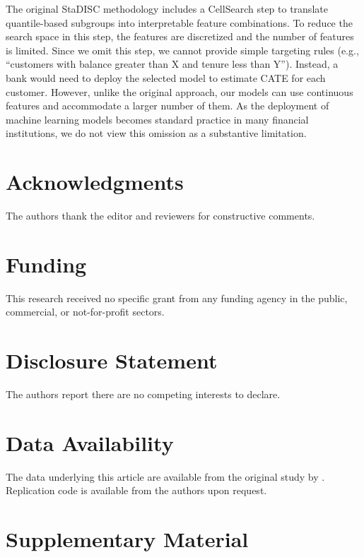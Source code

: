 \documentclass[12pt]{article}
\begin{document}
The original StaDISC methodology includes a CellSearch step to translate quantile-based subgroups into interpretable feature combinations. To reduce the search space in this step, the features are discretized and the number of features is limited. Since we omit this step, we cannot provide simple targeting rules (e.g., ``customers with balance greater than X and tenure less than Y''). Instead, a bank would need to deploy the selected model to estimate CATE for each customer. However, unlike the original approach, our models can use continuous features and accommodate a larger number of them. As the deployment of machine learning models becomes standard practice in many financial institutions, we do not view this omission as a substantive limitation.

\section*{Acknowledgments}
The authors thank the editor and reviewers for constructive comments.

\section*{Funding}
This research received no specific grant from any funding agency in the public, commercial, or not-for-profit sectors.

\section*{Disclosure Statement}
The authors report there are no competing interests to declare.

\section*{Data Availability}
The data underlying this article are available from the original study by \citet{alan2018}. Replication code is available from the authors upon request.

\newpage



\clearpage
\section*{Supplementary Material}
\setcounter{section}{0}
\renewcommand{\thesection}{S\arabic{section}}
\setcounter{subsection}{0}
\renewcommand{\thesubsection}{\thesection.\arabic{subsection}}
\setcounter{table}{0}
\renewcommand{\thetable}{S\arabic{table}}
\setcounter{figure}{0}
\renewcommand{\thefigure}{S\arabic{figure}}
\setcounter{equation}{0}
\renewcommand{\theequation}{S\arabic{equation}}
\end{document}

